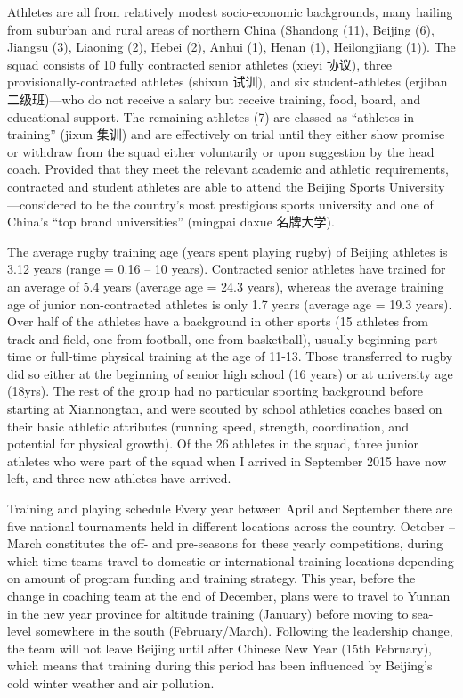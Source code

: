 \documentclass[12pt]{report}
\begin{document}
Athletes are all from relatively modest socio-economic backgrounds, many hailing from suburban and rural areas of northern China (Shandong (11), Beijing (6), Jiangsu (3), Liaoning (2), Hebei (2), Anhui (1), Henan (1), Heilongjiang (1)).  The squad consists of 10 fully contracted senior athletes (xieyi 协议), three provisionally-contracted athletes (shixun 试训), and six student-athletes (erjiban 二级班)—who do not receive a salary but receive training, food, board, and educational support.  The remaining athletes (7) are classed as “athletes in training” (jixun 集训) and are effectively on trial until they either show promise or withdraw from the squad either voluntarily or upon suggestion by the head coach.  Provided that they meet the relevant academic and athletic requirements, contracted and student athletes are able to attend the Beijing Sports University—considered to be the country’s most prestigious sports university and one of China’s “top brand universities” (mingpai daxue 名牌大学).

The average rugby training age (years spent playing rugby) of Beijing athletes is 3.12 years (range = 0.16 – 10 years).  Contracted senior athletes have trained for an average of 5.4 years (average age = 24.3 years), whereas the average training age of junior non-contracted athletes is only 1.7 years (average age = 19.3 years).  Over half of the athletes have a background in other sports (15 athletes from track and field, one from football, one from basketball), usually beginning part-time or full-time physical training at the age of 11-13.  Those transferred to rugby did so either at the beginning of senior high school (16 years) or at university age (18yrs).  The rest of the group had no particular sporting background before starting at Xiannongtan, and were scouted by school athletics coaches based on their basic athletic attributes (running speed, strength, coordination, and potential for physical growth).  Of the 26 athletes in the squad, three junior athletes who were part of the squad when I arrived in September 2015 have now left, and three new athletes have arrived.

Training and playing schedule
Every year between April and September there are five national tournaments held in different locations across the country.  October – March constitutes the off- and pre-seasons for these yearly competitions, during which time teams travel to domestic or international training locations depending on amount of program funding and training strategy.  This year, before the change in coaching team at the end of December, plans were to travel to Yunnan in the new year province for altitude training (January) before moving to sea-level somewhere in the south (February/March).  Following the leadership change, the team will not leave Beijing until after Chinese New Year (15th February), which means that training during this period has been influenced by Beijing’s cold winter weather and air pollution.
\end{document}
